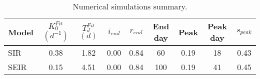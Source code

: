 \begin{table}[h!]
\centering
\caption{Numerical simulations summary.}
\label{tab:models}
\begin{tabular}{lcccccccc}
\toprule
           Model & $K_0^{Fit}$ $(d^{-1})$ & $T_d^{Fit}$ $(d)$ & $i_{end}$ & $r_{end}$ & End day & Peak  & Peak day & $s_{peak}$\\
\midrule
SIR &               0.38 &              1.82 &      0.00 &      0.84 &             60 &      0.19 &              18   &   0.43 \\
SEIR &              0.15 &              4.51 &      0.00 &      0.84 &            100 &      0.19 &              41   &   0.45 \\
\bottomrule
\end{tabular}
\end{table}